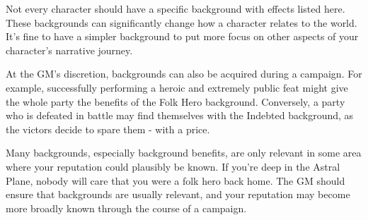   Not every character should have a specific background with effects listed here.
  These backgrounds can significantly change how a character relates to the world.
  It's fine to have a simpler background to put more focus on other aspects of your character's narrative journey.

  At the GM's discretion, backgrounds can also be acquired during a campaign.
  For example, successfully performing a heroic and extremely public feat might give the whole party the benefits of the Folk Hero background.
  Conversely, a party who is defeated in battle may find themselves with the Indebted background, as the victors decide to spare them - with a price.

  Many backgrounds, especially background benefits, are only relevant in some area where your reputation could plausibly be known.
  If you're deep in the Astral Plane, nobody will care that you were a folk hero back home.
  The GM should ensure that backgrounds are usually relevant, and your reputation may become more broadly known through the course of a campaign.

